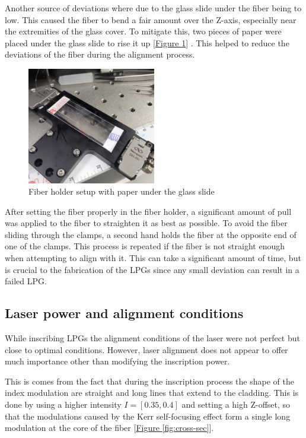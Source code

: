 \documentclass[11pt, openright]{book}
\begin{document}
        Another source of deviations where due to the glass slide under the fiber being to low. This caused the fiber to bend a fair amount over the Z-axis, especially near the extremities of the glass cover. To mitigate this, two pieces of paper were placed under the glass slide to rise it up [\hyperref[fig:setup]{Figure \ref{fig:setup}}] . This helped to reduce the deviations of the fiber during the alignment process.
        
         \begin{figure}[ht!]
            \centering
            \includegraphics[width=0.5\textwidth]{./includes/setup2.jpg}
            \caption{Fiber holder setup with paper under the glass slide}
            \label{fig:setup}
        \end{figure}

\newpage

        After setting the fiber properly in the fiber holder, a significant amount of pull was applied to the fiber to straighten it as best as possible. To avoid the fiber sliding through the clamps, a second hand holds the fiber at the opposite end of one of the clamps. This process is repeated if the fiber is not straight enough when attempting to align with it. This can take a significant amount of time, but is crucial to the fabrication of the LPGs since any small deviation can result in a failed LPG.

    \subsection*{Laser power and alignment conditions}

        While inscribing LPGs the alignment conditions of the laser were not perfect but close to optimal conditions. However, laser alignment does not appear to offer much importance other than modifying the inscription power.

        This is comes from the fact that during the inscription process the shape of the index modulation are straight and long lines that extend to the cladding. This is done by using a higher intensity  $I=[0.35,0.4]$ and setting a high Z-offset, so that the modulations caused by the Kerr  self-focusing effect form a single long modulation at the core of the fiber [\hyperref[fig:cross-sec]{Figure \ref{fig:cross-sec}}].
        
\end{document}
